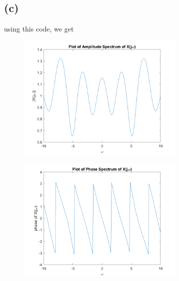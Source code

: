\documentclass[12pt]{article}
\begin{document}
\subsection*{(c)}
using this code, we get

\begin{center}
\begin{figure}[h]\includegraphics[width=8cm]{fig2}
\end{figure}
\end{center}
\begin{center}
\begin{figure}[h]\includegraphics[width=8cm]{fig3}
\end{figure}
\end{center}
\end{document}
